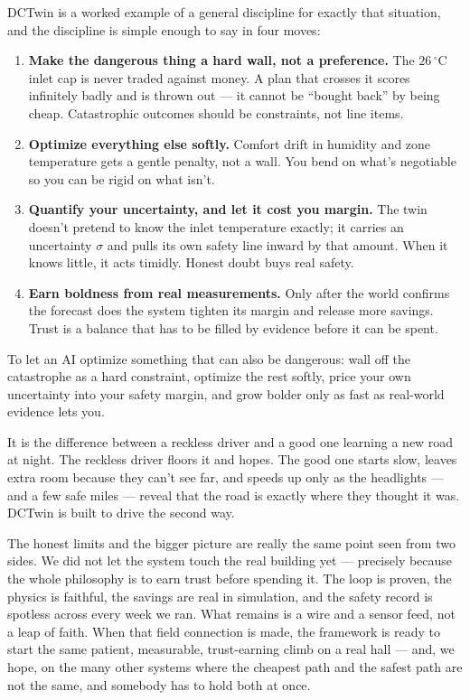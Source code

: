 DCTwin is a worked example of a general discipline for exactly that situation, and the discipline is simple enough to say in four moves:

\begin{enumerate}
  \item \textbf{Make the dangerous thing a hard wall, not a preference.} The $26\,^\circ$C inlet cap is never traded against money. A plan that crosses it scores infinitely badly and is thrown out --- it cannot be ``bought back'' by being cheap. Catastrophic outcomes should be constraints, not line items.
  \item \textbf{Optimize everything else softly.} Comfort drift in humidity and zone temperature gets a gentle penalty, not a wall. You bend on what's negotiable so you can be rigid on what isn't.
  \item \textbf{Quantify your uncertainty, and let it cost you margin.} The twin doesn't pretend to know the inlet temperature exactly; it carries an uncertainty $\sigma$ and pulls its own safety line inward by that amount. When it knows little, it acts timidly. Honest doubt buys real safety.
  \item \textbf{Earn boldness from real measurements.} Only after the world confirms the forecast does the system tighten its margin and release more savings. Trust is a balance that has to be filled by evidence before it can be spent.
\end{enumerate}

\begin{keyidea}
To let an AI optimize something that can also be dangerous: wall off the catastrophe as a hard constraint, optimize the rest softly, price your own uncertainty into your safety margin, and grow bolder only as fast as real-world evidence lets you.
\end{keyidea}

\begin{analogy}
It is the difference between a reckless driver and a good one learning a new road at night. The reckless driver floors it and hopes. The good one starts slow, leaves extra room because they can't see far, and speeds up only as the headlights --- and a few safe miles --- reveal that the road is exactly where they thought it was. DCTwin is built to drive the second way.
\end{analogy}

The honest limits and the bigger picture are really the same point seen from two sides. We did not let the system touch the real building yet --- precisely because the whole philosophy is to earn trust before spending it. The loop is proven, the physics is faithful, the savings are real in simulation, and the safety record is spotless across every week we ran. What remains is a wire and a sensor feed, not a leap of faith. When that field connection is made, the framework is ready to start the same patient, measurable, trust-earning climb on a real hall --- and, we hope, on the many other systems where the cheapest path and the safest path are not the same, and somebody has to hold both at once.


